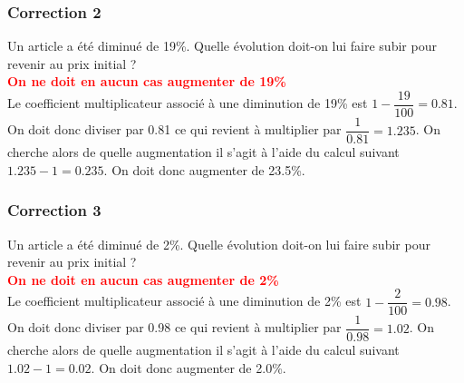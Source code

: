\documentclass[15pt, mathserif]{beamer}
\begin{document}
\begin{frame}
\vspace{-10mm}
	\frametitle{Correction 2}
\vspace*{1cm} Un article a été diminué de 19\%. Quelle évolution doit-on lui faire subir pour revenir au prix initial ? \\ \bcattention \textcolor{red}{\textbf{On ne doit en aucun cas augmenter de 19\%}} \\ Le coefficient multiplicateur associé à une diminution de 19\% est $1-\dfrac{19}{100}=0.81$. On doit donc diviser par 0.81 ce qui revient à multiplier par $\dfrac{1}{0.81}=1.235$. On cherche alors de quelle augmentation il s'agit à l'aide du calcul suivant $1.235-1=0.235$. On doit donc augmenter de 23.5\%. \\ \begin{center}  
  \end{center}\end{frame}


\begin{frame}
\vspace{-10mm}
	\frametitle{Correction 3}
\vspace*{1cm} Un article a été diminué de 2\%. Quelle évolution doit-on lui faire subir pour revenir au prix initial ? \\ \bcattention \textcolor{red}{\textbf{On ne doit en aucun cas augmenter de 2\%}} \\ Le coefficient multiplicateur associé à une diminution de 2\% est $1-\dfrac{2}{100}=0.98$. On doit donc diviser par 0.98 ce qui revient à multiplier par $\dfrac{1}{0.98}=1.02$. On cherche alors de quelle augmentation il s'agit à l'aide du calcul suivant $1.02-1=0.02$. On doit donc augmenter de 2.0\%. \\ \begin{center}  
  \end{center}\end{frame}
\end{document}
